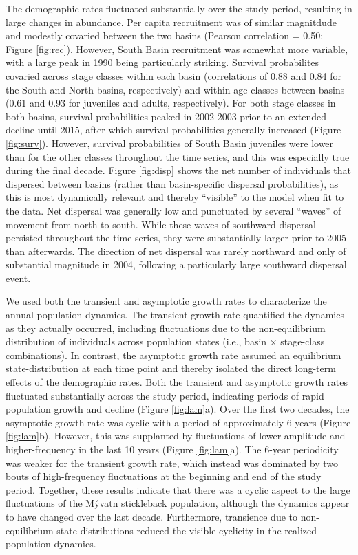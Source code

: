 \documentclass[11pt]{article}
\begin{document}
The demographic rates fluctuated substantially over the study period,
resulting in large changes in abundance. 
Per capita recruitment was of similar magnitdude and modestly covaried between the two basins
(Pearson correlation = 0.50; Figure \ref{fig:rec}).
However, South Basin recruitment was somewhat more variable,
with a large peak in 1990 being particularly striking.
Survival probabilites covaried across stage classes within each basin
(correlations of 0.88 and 0.84 for the South and North basins, respectively)
and within age classes between basins (0.61 and 0.93 for juveniles and adults, respectively).
For both stage classes in both basins, 
survival probabilities peaked in 2002-2003 
prior to an extended decline until 2015,
after which survival probabilities generally increased (Figure \ref{fig:surv}).
However, survival probabilities of South Basin juveniles were lower 
than for the other classes throughout the time series, 
and this was especially true during the final decade.
Figure \ref{fig:disp} shows the net number of individuals
that dispersed between basins (rather than basin-specific dispersal probabilities),
as this is most dynamically relevant 
and thereby ``visible'' to the model when fit to the data.
Net dispersal was generally low and punctuated by several ``waves'' of movement from 
north to south. 
While these waves of southward dispersal persisted throughout the time series,
they were substantially larger prior to 2005 than afterwards.
The direction of net dispersal was rarely northward and only of substantial magnitude in 2004,
following a particularly large southward dispersal event.

We used both the transient and asymptotic growth rates 
to characterize the annual population dynamics.
The transient growth rate quantified the dynamics as they actually occurred,
including fluctuations due to the non-equilibrium distribution of individuals across 
population states (i.e., basin $\times$ stage-class combinations).
In contrast, the asymptotic growth rate assumed an equilibrium state-distribution 
at each time point and thereby isolated the direct long-term effects of the demographic rates.
Both the transient and asymptotic growth rates fluctuated substantially 
across the study period, 
indicating periods of rapid population growth and decline (Figure \ref{fig:lam}a).
Over the first two decades, 
the asymptotic growth rate was cyclic with a period of approximately 6 years
(Figure \ref{fig:lam}b).
However, this was supplanted by fluctuations of lower-amplitude and higher-frequency  
in the last 10 years (Figure \ref{fig:lam}a).
The 6-year periodicity was weaker for the transient growth rate,
which instead was dominated by two bouts of high-frequency fluctuations
at the beginning and end of the study period.
Together, these results indicate that there was a cyclic aspect to the large fluctuations 
of the M\'{y}vatn stickleback population, 
although the dynamics appear to have changed over the last decade.
Furthermore, transience due to non-equilibrium state distributions
reduced the visible cyclicity in the realized population dynamics.
\end{document}
